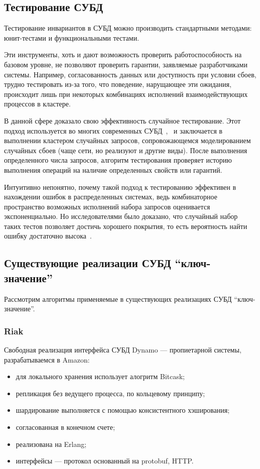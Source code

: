 \documentclass[14pt, russian]{scrartcl}
\begin{document}
\subsection{Тестирование СУБД}

Тестирование инвариантов в СУБД можно производить стандартными методами:
юнит-тестами и функциональными тестами.

Эти инструменты, хоть и дают возможность проверить работоспособность на базовом
уровне, не позволяют проверить гарантии, заявляемые разработчиками системы.
Например, согласованность данных или доступность при условии сбоев, трудно
тестировать из-за того, что поведение, нарущающее эти ожидания, происходит лишь
при некоторых комбинациях исполнений взаимодействующих процессов в кластере.

В данной сфере доказало свою эффективность случайное тестирование. Этот подход
используется во многих современных СУБД~\cite{cassandra},~\cite{tarantool} и
заключается в выполнении кластером случайных запросов, сопровожающемся
моделированием случайных сбоев (чаще сети, но реализуют и другие виды). После
выполнения определенного числа запросов, алгоритм тестирования проверяет историю
выполнения операций на наличие определенных свойств или гарантий.

Интуитивно непонятно, почему такой подход к тестированию эффективен в нахождении
ошибок в распределенных системах, ведь комбинаторное пространство возможных
исполнений набора запросов оценивается экспоненциально. Но исследователями было
доказано, что случайный набор таких тестов позволяет достичь хорошего покрытия,
то есть вероятность найти ошибку достаточно высока~\cite{majumdar2017random}.

\subsection{Существующие реализации СУБД ``ключ-значение''}

Рассмотрим алгоритмы применяемые в существующих реализациях СУБД
``ключ-значение''.

\subsubsection{Riak}

Свободная реализация интерфейса СУБД Dynamo --- пропиетарной системы,
разрабатываемся в Amazon:

\begin{itemize}
  \item для локального хранения использует алогритм Bitcask\cite{bitcask};
  \item репликация без ведущего процесса, по кольцевому принципу;
  \item шардирование выполняется с помощью консистентного хэширования;
  \item согласованная в конечном счете;
  \item реализована на Erlang;
  \item интерфейсы --- протокол основанный на protobuf, HTTP.
\end{itemize}
\end{document}
